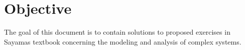 
\section*{Objective}

The goal of this document is to contain solutions to proposed exercises in
Sayama\textquotesingle s textbook\cite{Sayama:2015:ComplexSystems} concerning
the modeling and analysis of complex systems.
